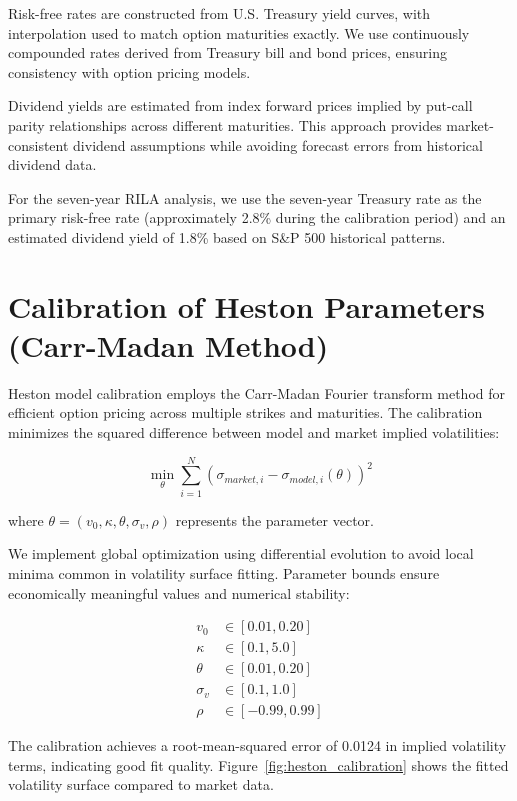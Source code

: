 \documentclass[12pt,a4paper]{report}
\begin{document}
Risk-free rates are constructed from U.S. Treasury yield curves, with interpolation used to match option maturities exactly. We use continuously compounded rates derived from Treasury bill and bond prices, ensuring consistency with option pricing models.

Dividend yields are estimated from index forward prices implied by put-call parity relationships across different maturities. This approach provides market-consistent dividend assumptions while avoiding forecast errors from historical dividend data.

For the seven-year RILA analysis, we use the seven-year Treasury rate as the primary risk-free rate (approximately 2.8\% during the calibration period) and an estimated dividend yield of 1.8\% based on S\&P 500 historical patterns.

\section{Calibration of Heston Parameters (Carr-Madan Method)}

Heston model calibration employs the Carr-Madan Fourier transform method for efficient option pricing across multiple strikes and maturities. The calibration minimizes the squared difference between model and market implied volatilities:

\begin{equation}
\min_{\theta} \sum_{i=1}^N (\sigma_{market,i} - \sigma_{model,i}(\theta))^2
\end{equation}

where $\theta = (v_0, \kappa, \theta, \sigma_v, \rho)$ represents the parameter vector.

We implement global optimization using differential evolution to avoid local minima common in volatility surface fitting. Parameter bounds ensure economically meaningful values and numerical stability:

\begin{align}
v_0 &\in [0.01, 0.20]\\
\kappa &\in [0.1, 5.0]\\
\theta &\in [0.01, 0.20]\\
\sigma_v &\in [0.1, 1.0]\\
\rho &\in [-0.99, 0.99]
\end{align}

The calibration achieves a root-mean-squared error of 0.0124 in implied volatility terms, indicating good fit quality. Figure~\ref{fig:heston_calibration} shows the fitted volatility surface compared to market data.
\end{document}
